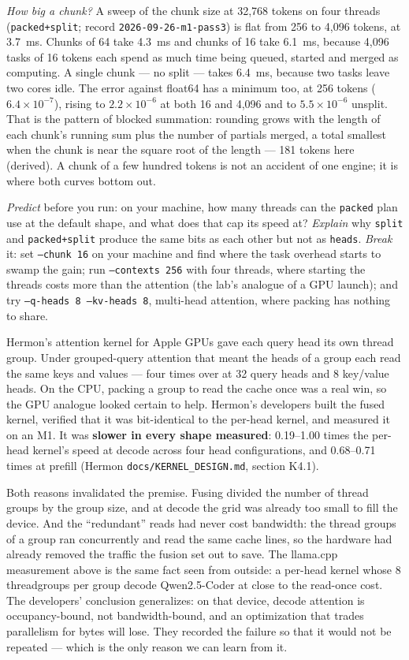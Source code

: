 \emph{How big a chunk?} A sweep of the chunk size at 32,768 tokens on four
threads (\texttt{packed+split}; record \texttt{2026-09-26-m1-pass3}) is flat from
256 to 4,096 tokens, at 3.7~ms. Chunks of 64 take 4.3~ms and chunks of 16 take
6.1~ms, because 4,096 tasks of 16 tokens each spend as much time being queued,
started and merged as computing. A single chunk --- no split --- takes 6.4~ms,
because two tasks leave two cores idle. The error against float64 has a
minimum too, at 256 tokens ($6.4\times10^{-7}$), rising to $2.2\times10^{-6}$ at
both 16 and 4,096 and to $5.5\times10^{-6}$ unsplit. That is the pattern of
blocked summation: rounding grows with the length of each chunk's running sum
plus the number of partials merged, a total smallest when the chunk is near the
square root of the length --- 181 tokens here (derived). A chunk of a few hundred
tokens is not an accident of one engine; it is where both curves bottom out.

\emph{Predict} before you run: on your machine, how many threads can the
\texttt{packed} plan use at the default shape, and what does that cap its speed
at? \emph{Explain} why \texttt{split} and \texttt{packed+split} produce the same
bits as each other but not as \texttt{heads}. \emph{Break} it: set
\texttt{--chunk 16} on your machine and find where the task overhead starts to
swamp the gain; run
\texttt{--contexts 256} with four threads, where starting the threads costs
more than the attention (the lab's analogue of a GPU launch); and try
\texttt{--q-heads 8 --kv-heads 8}, multi-head attention, where packing has
nothing to share.


Hermon's attention kernel for Apple GPUs gave each query head its own thread
group. Under grouped-query attention that meant the heads of a group each read
the same keys and values --- four times over at 32 query heads and 8
key/value heads. On the CPU, packing a group to read the cache once was a real
win, so the GPU analogue looked certain to help. Hermon's developers built the
fused kernel, verified that it was bit-identical to the per-head kernel, and
measured it on an M1. It was \textbf{slower in every shape measured}:
0.19--1.00 times the per-head kernel's speed at decode across four head
configurations, and 0.68--0.71 times at prefill (Hermon
\texttt{docs/KERNEL\_DESIGN.md}, section K4.1).

Both reasons invalidated the premise. Fusing divided the number of thread
groups by the group size, and at decode the grid was already too small to fill
the device. And the ``redundant'' reads had never cost bandwidth: the thread
groups of a group ran concurrently and read the same cache lines, so the
hardware had already removed the traffic the fusion set out to save. The
llama.cpp measurement above is the same fact seen from outside: a per-head
kernel whose 8 threadgroups per group decode Qwen2.5-Coder at close to the
read-once cost. The developers' conclusion generalizes: on that device, decode
attention is occupancy-bound, not bandwidth-bound, and an optimization that
trades parallelism for bytes will lose. They recorded the failure so that it
would not be repeated --- which is the only reason we can learn from it.

